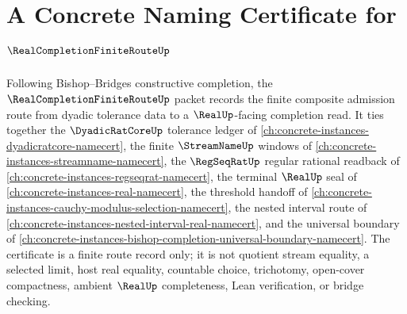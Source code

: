 \chapter{A Concrete Naming Certificate for $\RealCompletionFiniteRouteUp$}
\label{ch:concrete-instances-real-completion-finite-route-namecert}

Following Bishop--Bridges constructive completion, the $\RealCompletionFiniteRouteUp$ packet records the finite composite admission route from dyadic tolerance data to a $\RealUp$-facing completion read. It ties together the $\DyadicRatCoreUp$ tolerance ledger of \autoref{ch:concrete-instances-dyadicratcore-namecert}, the finite $\StreamNameUp$ windows of \autoref{ch:concrete-instances-streamname-namecert}, the $\RegSeqRatUp$ regular rational readback of \autoref{ch:concrete-instances-regseqrat-namecert}, the terminal $\RealUp$ seal of \autoref{ch:concrete-instances-real-namecert}, the threshold handoff of \autoref{ch:concrete-instances-cauchy-modulus-selection-namecert}, the nested interval route of \autoref{ch:concrete-instances-nested-interval-real-namecert}, and the universal boundary of \autoref{ch:concrete-instances-bishop-completion-universal-boundary-namecert}. The certificate is a finite route record only; it is not quotient stream equality, a selected limit, host real equality, countable choice, trichotomy, open-cover compactness, ambient $\RealUp$ completeness, Lean verification, or bridge checking.

